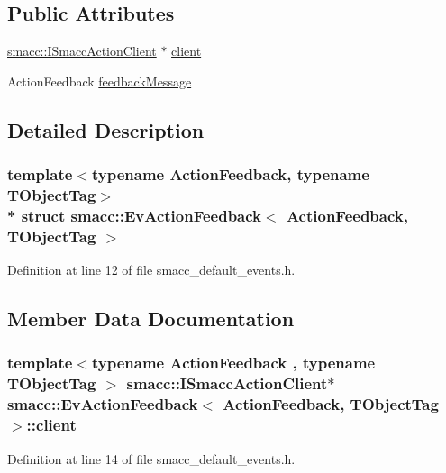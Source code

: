 \subsection*{Public Attributes}
\begin{DoxyCompactItemize}
\item 
\hyperlink{classsmacc_1_1ISmaccActionClient}{smacc\+::\+I\+Smacc\+Action\+Client} $\ast$ \hyperlink{structsmacc_1_1EvActionFeedback_aa03d351d03c02e916d59b8b766218569}{client}
\item 
Action\+Feedback \hyperlink{structsmacc_1_1EvActionFeedback_ae00f5e85eb9cec0d02ca394460d60015}{feedback\+Message}
\end{DoxyCompactItemize}


\subsection{Detailed Description}
\subsubsection*{template$<$typename Action\+Feedback, typename T\+Object\+Tag$>$\\*
struct smacc\+::\+Ev\+Action\+Feedback$<$ Action\+Feedback, T\+Object\+Tag $>$}



Definition at line 12 of file smacc\+\_\+default\+\_\+events.\+h.



\subsection{Member Data Documentation}
\subsubsection[{\texorpdfstring{client}{client}}]{\setlength{\rightskip}{0pt plus 5cm}template$<$typename Action\+Feedback , typename T\+Object\+Tag $>$ {\bf smacc\+::\+I\+Smacc\+Action\+Client}$\ast$ {\bf smacc\+::\+Ev\+Action\+Feedback}$<$ Action\+Feedback, T\+Object\+Tag $>$\+::client}\hypertarget{structsmacc_1_1EvActionFeedback_aa03d351d03c02e916d59b8b766218569}{}\label{structsmacc_1_1EvActionFeedback_aa03d351d03c02e916d59b8b766218569}


Definition at line 14 of file smacc\+\_\+default\+\_\+events.\+h.



